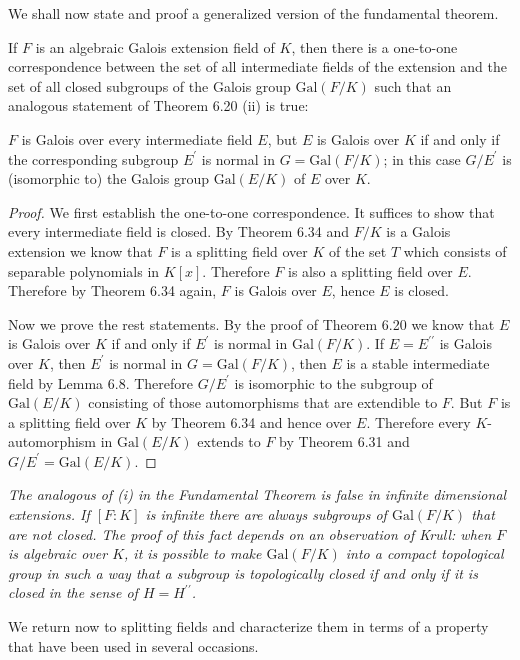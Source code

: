 We shall now state and proof a generalized version of the fundamental theorem.
\begin{theorem}
If $F$ is an algebraic Galois extension field of $K$, then there is a one-to-one correspondence between the set of all intermediate fields of the extension and the set of all closed subgroups of the Galois group $\mathrm{Gal}(F/K)$ such that an analogous statement of Theorem 6.20 (ii) is true:\par
$F$ is Galois over every intermediate field $E$, but $E$ is Galois over $K$ if and only if the corresponding subgroup $E^\prime$ is normal in $G=\mathrm{Gal}(F/K)$; in this case $G/E^\prime$ is (isomorphic to) the Galois group $\mathrm{Gal}(E/K)$ of $E$ over $K$.
\end{theorem}
\begin{proof}
We first establish the one-to-one correspondence. It suffices to show that every intermediate field is closed. By Theorem 6.34 and $F/K$ is a Galois extension we know that $F$ is a splitting field over $K$ of the set $T$ which consists of separable polynomials in $K[x]$. Therefore $F$ is also a splitting field over $E$. Therefore by Theorem 6.34 again, $F$ is Galois over $E$, hence $E$ is closed.\par
Now we prove the rest statements. By the proof of Theorem 6.20 we know that $E$ is Galois over $K$ if and only if $E^\prime$ is normal in $\mathrm{Gal}(F/K)$. If $E=E^{\prime\prime}$ is Galois over $K$, then $E^\prime$ is normal in $G=\mathrm{Gal}(F/K)$, then $E$ is a stable intermediate field by Lemma 6.8. Therefore $G/E^\prime$ is isomorphic to the subgroup of $\mathrm{Gal}(E/K)$ consisting of those automorphisms that are extendible to $F$. But $F$ is a splitting field over $K$ by Theorem 6.34 and hence over $E$. Therefore every $K$-automorphism in $\mathrm{Gal}(E/K)$ extends to $F$ by Theorem 6.31 and $G/E^\prime=\mathrm{Gal}(E/K)$.
\end{proof}
\begin{note}\em
The analogous of (i) in the Fundamental Theorem is false in infinite dimensional extensions. If $[F:K]$ is infinite there are always subgroups of $\mathrm{Gal}(F/K)$ that are not closed. The proof of this fact depends on an observation of Krull: when $F$ is algebraic over $K$, it is possible to make $\mathrm{Gal}(F/K)$ into a compact topological group in such a way that a subgroup is topologically closed if and only if it is closed in the sense of $H=H^{\prime\prime}$.
\end{note}
We return now to splitting fields and characterize them in terms of a property that have been used in several occasions.
